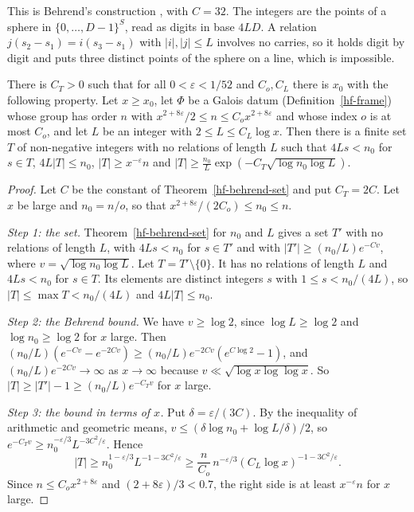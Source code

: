 This is Behrend's construction \cite{Beh46}, with $C=32$. The integers are the points of a sphere in
$\{0,\ldots,D-1\}^S$, read as digits in base $4LD$. A relation $j(s_2-s_1)=i(s_3-s_1)$ with
$|i|,|j|\leq L$ involves no carries, so it holds digit by digit and puts three distinct points of
the sphere on a line, which is impossible.

\begin{corollary}\label{hf-behrend-set-at-scale}
There is $C_T>0$ such that for all $0<\varepsilon<1/52$ and $C_o,C_L$ there is $x_0$ with the
following property. Let $x\geq x_0$, let $\Phi$ be a Galois datum (Definition~\ref{hf-frame}) whose group
has order $n$ with $x^{2+8\varepsilon}/2\leq n\leq C_ox^{2+8\varepsilon}$ and whose index $o$ is at
most $C_o$, and let $L$ be an integer with $2\leq L\leq C_L\log x$. Then there is a finite set $T$ of
non-negative integers with no relations of length $L$ such that $4Ls<n_0$ for $s\in T$, $4L|T|\leq
n_0$, $|T|\geq x^{-\varepsilon}n$ and $|T|\geq\frac{n_0}{L}\exp(-C_T\sqrt{\log n_0\log L})$.
\end{corollary}

\begin{proof}
Let $C$ be the constant of Theorem~\ref{hf-behrend-set} and put $C_T=2C$. Let $x$ be large and
$n_0=n/o$, so that $x^{2+8\varepsilon}/(2C_o)\leq n_0\leq n$.

\emph{Step 1: the set.} Theorem~\ref{hf-behrend-set} for $n_0$ and $L$ gives a set $T'$ with no
relations of length $L$, with $4Ls<n_0$ for $s\in T'$ and with
$|T'|\geq(n_0/L)e^{-Cv}$, where $v=\sqrt{\log n_0\log L}$. Let $T=T'\setminus\{0\}$. It has no
relations of length $L$ and $4Ls<n_0$ for $s\in T$. Its elements are distinct integers $s$ with
$1\leq s<n_0/(4L)$, so $|T|\leq\max T<n_0/(4L)$ and $4L|T|\leq n_0$.

\emph{Step 2: the Behrend bound.} We have $v\geq\log2$, since $\log L\geq\log2$ and
$\log n_0\geq\log2$ for $x$ large. Then $(n_0/L)(e^{-Cv}-e^{-2Cv})\geq(n_0/L)e^{-2Cv}(e^{C\log2}-1)$,
and $(n_0/L)e^{-2Cv}\to\infty$ as $x\to\infty$ because $v\ll\sqrt{\log x\log\log x}$. So
$|T|\geq|T'|-1\geq(n_0/L)e^{-C_Tv}$ for $x$ large.

\emph{Step 3: the bound in terms of $x$.} Put $\delta=\varepsilon/(3C)$. By the inequality of
arithmetic and geometric means, $v\leq(\delta\log n_0+\log L/\delta)/2$, so
$e^{-C_Tv}\geq n_0^{-\varepsilon/3}L^{-3C^2/\varepsilon}$. Hence
\[
 |T|\geq n_0^{1-\varepsilon/3}L^{-1-3C^2/\varepsilon}\geq\frac{n}{C_o}\,n^{-\varepsilon/3}
 (C_L\log x)^{-1-3C^2/\varepsilon}.
\]
Since $n\leq C_ox^{2+8\varepsilon}$ and $(2+8\varepsilon)/3<0.7$, the right side is at least
$x^{-\varepsilon}n$ for $x$ large.
\end{proof}

